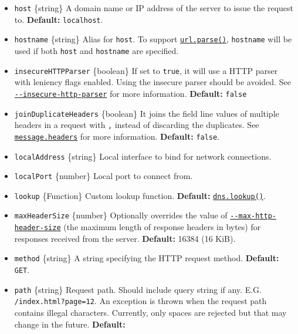 \begin{itemize}
\begin{itemize}
{    hints}.
  \item
    \texttt{host} \{string\} A domain name or IP address of the server
    to issue the request to. \textbf{Default:}
    \texttt{\textquotesingle{}localhost\textquotesingle{}}.
  \item
    \texttt{hostname} \{string\} Alias for \texttt{host}. To support
    \href{url.md\#urlparseurlstring-parsequerystring-slashesdenotehost}{\texttt{url.parse()}},
    \texttt{hostname} will be used if both \texttt{host} and
    \texttt{hostname} are specified.
  \item
    \texttt{insecureHTTPParser} \{boolean\} If set to \texttt{true}, it
    will use a HTTP parser with leniency flags enabled. Using the
    insecure parser should be avoided. See
    \href{cli.md\#--insecure-http-parser}{\texttt{-\/-insecure-http-parser}}
    for more information. \textbf{Default:} \texttt{false}
  \item
    \texttt{joinDuplicateHeaders} \{boolean\} It joins the field line
    values of multiple headers in a request with \texttt{,} instead of
    discarding the duplicates. See
    \hyperref[messageheaders]{\texttt{message.headers}} for more
    information. \textbf{Default:} \texttt{false}.
  \item
    \texttt{localAddress} \{string\} Local interface to bind for network
    connections.
  \item
    \texttt{localPort} \{number\} Local port to connect from.
  \item
    \texttt{lookup} \{Function\} Custom lookup function.
    \textbf{Default:}
    \href{dns.md\#dnslookuphostname-options-callback}{\texttt{dns.lookup()}}.
  \item
    \texttt{maxHeaderSize} \{number\} Optionally overrides the value of
    \href{cli.md\#--max-http-header-sizesize}{\texttt{-\/-max-http-header-size}}
    (the maximum length of response headers in bytes) for responses
    received from the server. \textbf{Default:} 16384 (16 KiB).
  \item
    \texttt{method} \{string\} A string specifying the HTTP request
    method. \textbf{Default:}
    \texttt{\textquotesingle{}GET\textquotesingle{}}.
  \item
    \texttt{path} \{string\} Request path. Should include query string
    if any. E.G.
    \texttt{\textquotesingle{}/index.html?page=12\textquotesingle{}}. An
    exception is thrown when the request path contains illegal
    characters. Currently, only spaces are rejected but that may change
    in the future. \textbf{Default:}

\end{itemize}
\end{itemize}
